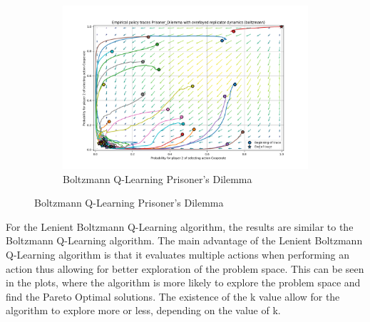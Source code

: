 \documentclass[12pt,letterpaper, onecolumn]{exam}
\begin{document}
\begin{figure}[H]
\begin{subfigure}{.5\textwidth}
      \label{fig:sfigbmp}
    \end{subfigure}%
    \begin{subfigure}{.5\textwidth}
      \centering
      \includegraphics[width=.6\linewidth]{plots/replicator_trajectoreis_Prisoner_Dilemma_boltzmann.png}
      \caption{Boltzmann Q-Learning Prisoner's Dilemma}
      \label{fig:sfigbpd}
    \end{subfigure}%
\end{figure}

For the Lenient Boltzmann Q-Learning algorithm, the results are similar to the Boltzmann Q-Learning algorithm. The main advantage of the Lenient Boltzmann Q-Learning algorithm is that it
evaluates multiple actions when performing an action thus allowing for better exploration of the problem space. This can be seen in the plots, where the algorithm is more likely to explore
the problem space and find the Pareto Optimal solutions. The existence of the k value allow for the algorithm to explore more or less, depending on the value of k.
\end{document}
